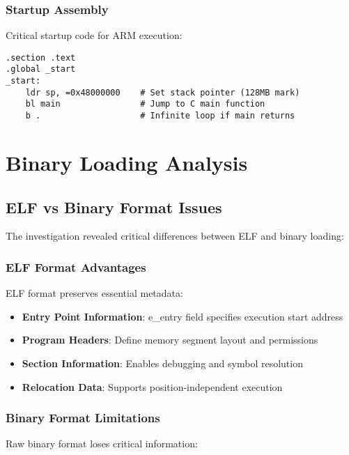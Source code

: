 \documentclass[11pt,a4paper]{article}
\begin{document}
\subsubsection{Startup Assembly}

Critical startup code for ARM execution:

\begin{lstlisting}[language={[ARM]Assembler}, caption=FreeRTOS Startup]
.section .text
.global _start
_start:
    ldr sp, =0x48000000    # Set stack pointer (128MB mark)
    bl main                # Jump to C main function
    b .                    # Infinite loop if main returns
\end{lstlisting}

\section{Binary Loading Analysis}

\subsection{ELF vs Binary Format Issues}

The investigation revealed critical differences between ELF and binary loading:

\subsubsection{ELF Format Advantages}

ELF format preserves essential metadata:

\begin{itemize}
\item \textbf{Entry Point Information}: e\_entry field specifies execution start address
\item \textbf{Program Headers}: Define memory segment layout and permissions
\item \textbf{Section Information}: Enables debugging and symbol resolution
\item \textbf{Relocation Data}: Supports position-independent execution
\end{itemize}

\subsubsection{Binary Format Limitations}

Raw binary format loses critical information:
\end{document}

